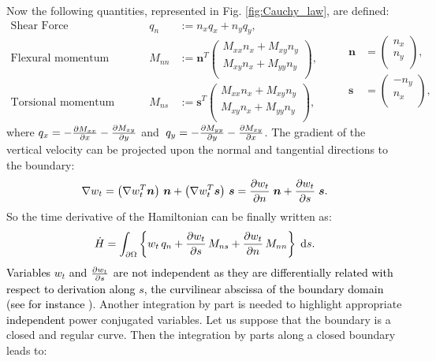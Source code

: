 \documentclass[11pt]{article}
\newcommand{\revOne}[1]{\textcolor{black}{#1}}
\begin{document}
	Now the following quantities, represented in Fig. \ref{fig:Cauchy_law}, are defined: 
	\begin{equation}
	\label{eq:QnMnnMns}
	\begin{aligned}
	\text{Shear Force}& \; \; \quad &q_{n} &:= n_x q_x + n_y q_y,   \\
	\text{Flexural momentum}& \quad 
	&M_{nn} &:= \bm{n}^T	
	\begin{pmatrix}
	M_{xx} n_x + M_{xy} n_y \\
	M_{xy} n_x + M_{yy} n_y \\
	\end{pmatrix}, \\
	\text{Torsional momentum}& \quad &M_{ns} &:= \bm{s}^T	
	\begin{pmatrix}
	M_{xx} n_x + M_{xy} n_y \\
	M_{xy} n_x + M_{yy} n_y \\
	\end{pmatrix}, 
	\end{aligned} \qquad
	\begin{aligned}
	\bm{n} &= 
	\begin{pmatrix}
	n_x \\
	n_y \\
	\end{pmatrix}, \\
	\bm{s} &= 
	\begin{pmatrix}
	-n_y \\
	n_x \\
	\end{pmatrix},
	\end{aligned}
	\end{equation}
	where $q_x = - \diffp{M_{xx}}{x} -\diffp{M_{xy}}{y}$ and $\; q_y = - \diffp{M_{yy}}{y} -\diffp{M_{xy}}{x}$. The gradient of the vertical velocity can be projected upon the normal and tangential directions to the boundary:
	\begin{equation}
	\label{eq:gr_dec_ns}
	\nabla w_t = \left(\nabla w_t^T \bm{n} \right) \,\bm{n} + \left(\nabla w_t^T \bm{s} \right) \, \bm{s} = \diffp{w_t}{n} \; \bm{n} +   \diffp{w_t}{s} \; \bm{s}.
	\end{equation}
	So the time derivative of the Hamiltonian can be finally written as:
	\begin{equation}
	\dot{H} = \int_{\partial \Omega} \left\{ w_t \, q_n + \diffp{w_t}{s} \, M_{ns} + \diffp{w_t}{n} \, M_{nn}\right\} \d{s}.
	\end{equation}
	\revOne{Variables $w_t$ and $\diffp{w_t}{s}$ are not independent as they are differentially related with respect to derivation along $s$, the curvilinear abscissa of the boundary domain (see for instance \cite{timoshenko1959theory})}. Another integration by part is needed to highlight appropriate \revOne{independent} power conjugated variables. Let us suppose that the boundary is a closed and regular curve. Then the integration by parts along a closed boundary leads to:
\end{document}
